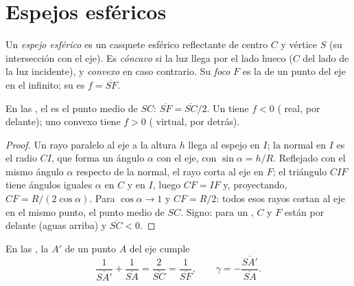 \section{Espejos esféricos}

\begin{definition}\label{def:b1:mirrors-thin-lenses:mirror}
Un \emph{espejo esférico} es un casquete esférico reflectante de centro
$C$ y vértice $S$ (su intersección con el eje). Es \emph{cóncavo} si la
luz llega por el lado hueco ($C$ del lado de la luz incidente), y
\emph{convexo} en caso contrario. Su \emph{foco} $F$ es la  de un
punto del eje en el infinito; su  es $f = \overline{SF}$.
\end{definition}

\begin{proposition}\label{prop:b1:mirrors-thin-lenses:focus}
En las , el  es el punto medio de $SC$:
$\overline{SF} = \overline{SC}/2$. Un  tiene $f < 0$ (
real, por delante); uno convexo tiene $f > 0$ ( virtual, por detrás).
\end{proposition}

\begin{proof}
Un rayo paralelo al eje a la altura $h$ llega al espejo en $I$; la normal
en $I$ es el radio $CI$, que forma un ángulo $\alpha$ con el eje, con
$\sin\alpha = h/R$. Reflejado con el mismo ángulo $\alpha$ respecto de la
normal, el rayo corta al eje en $F$; el triángulo $CIF$ tiene ángulos
iguales $\alpha$ en $C$ y en $I$, luego $CF = IF$ y, proyectando,
$CF = R/(2\cos\alpha)$. Para  $\cos\alpha \to 1$ y
$CF = R/2$: todos esos rayos cortan al eje en el mismo punto, el punto
medio de $SC$. Signo: para un , $C$ y $F$ están por delante
(aguas arriba) y $\overline{SC} < 0$.
\end{proof}

\begin{theorem}\label{thm:b1:mirrors-thin-lenses:mirrorconj}
En las , la  $A'$ de un punto $A$ del eje
cumple
\[
\frac{1}{\overline{SA'}} + \frac{1}{\overline{SA}} = \frac{2}{\overline{SC}}
= \frac{1}{\overline{SF}},
\qquad
\gamma = -\frac{\overline{SA'}}{\overline{SA}} .
\]
\end{theorem}

